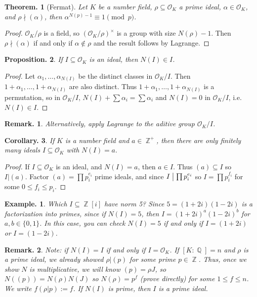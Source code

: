 \documentclass[11pt, a4paper]{memoir}
\DeclareMathOperator{\Q}{{\mathbb{Q}}}
\DeclareMathOperator{\Z}{{\mathbb{Z}}}
\renewcommand{\div}{\bigm|}
\theoremstyle{change}
\newtheorem{theorem}{Theorem.}[section]
\newtheorem{corollary}[theorem]{Corollary.}
\newtheorem{proposition}[theorem]{Proposition.}
\theoremstyle{plain}
\theoremstyle{nonumberplain}
\newtheorem{example}{Example.}
\newtheorem{remark}{Remark.}
\newtheorem{proof}{Proof}
\numberwithin{equation}{section}
\begin{document}
\begin{theorem}[Fermat]
    Let $K$ be a number field, $\rho\subseteq\mathcal{O}_K$ a prime ideal, $\alpha\in\mathcal{O}_K$, and $\rho\nmid(\alpha)$, then $\alpha^{N(p)-1}\equiv 1\pmod{p}$.
\end{theorem}
\begin{proof}
    $\mathcal{O}_K/\rho$ is a field, so $(\mathcal{O}_K/\rho)^\times$ is a group with size $N(\rho)-1$.
    Then $\rho\nmid(\alpha)$ if and only if $\alpha\notin\rho$ and the result follows by Lagrange.
\end{proof}
\begin{proposition}
    If $I\subseteq\mathcal{O}_K$ is an ideal, then $N(I)\in I$.
\end{proposition}
\begin{proof}
    Let $\alpha_1,\ldots,\alpha_{N(I)}$ be the distinct classes in $\mathcal{O}_K/I$.
    Then $1+\alpha_1,\ldots,1+\alpha_{N(I)}$ are also distinct.
    Thus $1+\alpha_1,\ldots,1+\alpha_{N(I)}$ is a permutation, so in $\mathcal{O}_K/I$, $N(I)+\sum\alpha_i=\sum\alpha_i$ and $N(I)=0$ in $\mathcal{O}_K/I$, i.e. $N(I)\in I$.
\end{proof}
\begin{remark}
    Alternatively, apply Lagrange to the aditive group $\mathcal{O}_K/I$.
\end{remark}
\begin{corollary}
    If $K$ is a number field and $a\in\Z^+$, then there are only finitely many ideals $I\subseteq\mathcal{O}_K$ with $N(I)=a$.
\end{corollary}
\begin{proof}
    If $I\subseteq\mathcal{O}_K$ is an ideal, and $N(I)=a$, then $a\in I$.
    Thus $(a)\subseteq I$ so $I|(a)$.
    Factor $(a)=\prod p_i^{e_i}$ prime ideals, and since $I\div\prod p_i^{e_i}$ so $I=\prod p_i^{f_i}$ for some $0\leq f_i\leq p_i$.
\end{proof}
\begin{example}
    Which $I\subseteq\Z[i]$ have norm 5?
    Since $5=(1+2i)(1-2i)$ is a factorization into primes, since if $N(I)=5$, then $I=(1+2i)^a(1-2i)^b$ for $a,b\in\{0,1\}$.
    In this case, you can check $N(I)=5$ if and only if $I=(1+2i)$ or $I=(1-2i)$.
\end{example}
\begin{remark}
    Note: if $N(I)=I$ if and only if $I=\mathcal{O}_K$.
    If $[K:\Q]=n$ and $\rho$ is a prime ideal, we already showed $\rho|(p)$ for some prime $p\in\Z$.
    Thus, once we show $N$ is multiplicative, we will know $(p)=\rho J$, so $N((p))=N(\rho)N(J)$ so $N(\rho)=p^f$ (prove directly) for some $1\leq f\leq n$.
    We write $f(\rho|p):=f$.
    If $N(I)$ is prime, then $I$ is a prime ideal.
\end{remark}
\end{document}
